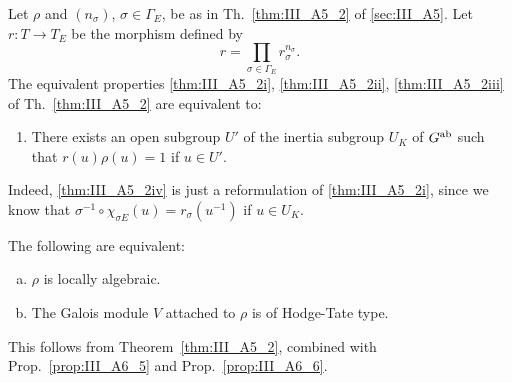 \begin{subappendices}
\begin{prop}\label{prop:III_A6_6}
	Let $\rho$ and $(n_\sigma)$, $\sigma \in \Gamma_E$, be as in
	Th.~\ref{thm:III_A5_2} of \ref{sec:III_A5}.  Let $r\colon T \to T_E$ be
	the morphism defined by
	\[
		r = \prod_{\sigma \in \Gamma_E} r_\sigma^{n_\sigma}.
	\]
	The equivalent properties \ref{thm:III_A5_2i}, \ref{thm:III_A5_2ii},
	\ref{thm:III_A5_2iii} of Th.~\ref{thm:III_A5_2} are equivalent to:
	\begin{enumerate}[resume*=thm_IIIA5_2]
	\item\label{thm:III_A5_2iv}
		There exists an open subgroup $U'$ of the inertia subgroup
		$U_K$ of $G^{\mathrm{ab}}$ such that $r(u) \rho(u) = 1$ if $u \in U'$.
	\end{enumerate}
\end{prop}
Indeed, \ref{thm:III_A5_2iv} is just a reformulation of \ref{thm:III_A5_2i},
since we know that $\sigma^{-1} \circ \chi_{\sigma E}(u) = r_\sigma(u^{-1})$ if
$u \in U_K$.

\begin{corp}
	The following are equivalent:
	\begin{enumerate}[(a)]
	\item $\rho$ is locally algebraic.
	\item The Galois module $V$ attached to $\rho$ is of Hodge-Tate type.
	\end{enumerate}
\end{corp}
This follows from Theorem~\ref{thm:III_A5_2}, combined with
Prop.~\ref{prop:III_A6_5} and Prop.~\ref{prop:III_A6_6}.


\end{subappendices}
